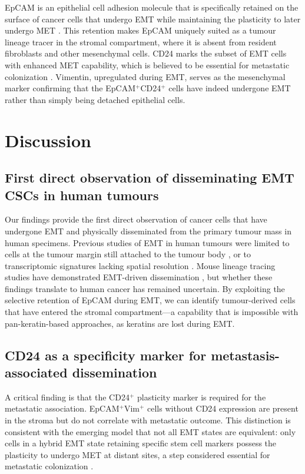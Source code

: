 \documentclass[11pt]{article}
\begin{document}
EpCAM is an epithelial cell adhesion molecule that is specifically retained on the surface of cancer cells that undergo EMT while maintaining the plasticity to later undergo MET \citep{Grosse-Wilde2015}. This retention makes EpCAM uniquely suited as a tumour lineage tracer in the stromal compartment, where it is absent from resident fibroblasts and other mesenchymal cells. CD24 marks the subset of EMT cells with enhanced MET capability, which is believed to be essential for metastatic colonization \citep{Chaffer2013}. Vimentin, upregulated during EMT, serves as the mesenchymal marker confirming that the EpCAM$^{+}$CD24$^{+}$ cells have indeed undergone EMT rather than simply being detached epithelial cells.

\section{Discussion}

\subsection{First direct observation of disseminating EMT CSCs in human tumours}

Our findings provide the first direct observation of cancer cells that have undergone EMT and physically disseminated from the primary tumour mass in human specimens. Previous studies of EMT in human tumours were limited to cells at the tumour margin still attached to the tumour body \citep{Brabletz2001}, or to transcriptomic signatures lacking spatial resolution \citep{Puram2017}. Mouse lineage tracing studies have demonstrated EMT-driven dissemination \citep{Rhim2012}, but whether these findings translate to human cancer has remained uncertain. By exploiting the selective retention of EpCAM during EMT, we can identify tumour-derived cells that have entered the stromal compartment---a capability that is impossible with pan-keratin-based approaches, as keratins are lost during EMT.

\subsection{CD24 as a specificity marker for metastasis-associated dissemination}

A critical finding is that the CD24$^{+}$ plasticity marker is required for the metastatic association. EpCAM$^{+}$Vim$^{+}$ cells without CD24 expression are present in the stroma but do not correlate with metastatic outcome. This distinction is consistent with the emerging model that not all EMT states are equivalent: only cells in a hybrid EMT state retaining specific stem cell markers possess the plasticity to undergo MET at distant sites, a step considered essential for metastatic colonization \citep{Pastushenko2018,Jolly2015,Kroger2019}.
\end{document}
